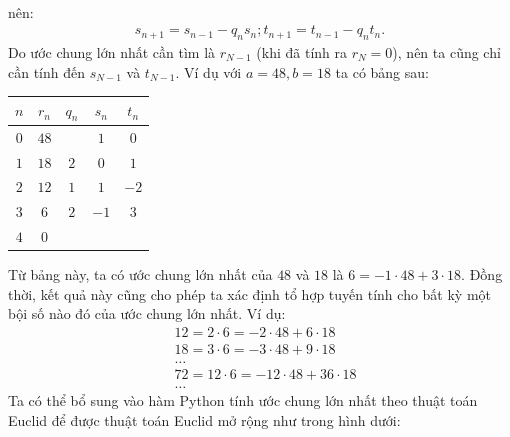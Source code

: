 \begin{multicols}{2}
\begin{align*}
	\end{align*}
	nên:
	\begin{align*}
		s_{n+1}=s_{n-1}-q_n s_n;
		t_{n+1}=t_{n-1}-q_n t_n.
	\end{align*}
	Do ước chung lớn nhất cần tìm là $r_{N-1}$ (khi đã tính ra $r_N=0$), nên ta cũng chỉ cần tính đến $s_{N-1}$ và $t_{N-1}$.
	\vskip 0.1cm
	Ví dụ với $a=48,b=18$ ta có bảng sau:
	\begin{table}[H]
		\vspace*{-5pt}
		\centering
		\captionsetup{labelformat= empty, justification=centering}
		\setlength{\tabcolsep}{8pt}
		\renewcommand{\arraystretch}{1.1}
		\begin{tabular}{|c|c|c|c|c|}
			\hline
			$n$	&$r_n$&	$q_n$&	$s_n$&	$t_n$\\
			\hline
			$0$	&$48$&	&	$1$&	$0$\\
			\hline
			$1$	&$18$&	$2$&	$0$&	$1$\\
			\hline
			$2$&	$12$&	$1$&	$1$&	$-2$\\
			\hline
			$3$&	$6$&	$2$&	$-1$&	$3$\\
			\hline
			$4$&	$0$ & & &\\
			\hline	
		\end{tabular}
		\vspace*{-5pt}
	\end{table}		
	Từ bảng này, ta có ước chung lớn nhất của $48$ và $18$ là $6=-1\cdot 48+3\cdot 18$.
	\vskip 0.1cm
	Đồng thời, kết quả này cũng cho phép ta xác định tổ hợp tuyến tính cho bất kỳ một bội số nào đó của ước chung lớn nhất. Ví dụ:
	\begin{align*}
		&12=2\cdot 6=-2\cdot 48+6\cdot 18 \\[-0.4ex]
		&18=3\cdot 6=-3\cdot 48+9\cdot 18 \\[-0.4ex]
		&\ldots\\[-0.4ex]
		&72=12\cdot 6=-12\cdot 48+36\cdot 18 \\[-0.4ex]
		&\ldots
	\end{align*}
	Ta có thể bổ sung vào hàm Python tính ước chung lớn nhất theo thuật toán Euclid để được thuật toán Euclid mở rộng như trong hình dưới:
	\begin{figure}[H]
		\centering
		\vspace*{-5pt}
		\captionsetup{labelformat= empty, justification=centering}

\end{figure}
\end{multicols}
